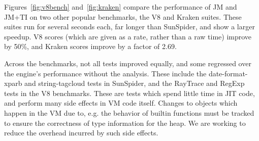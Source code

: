 Figures~\ref{fig:v8bench} and~\ref{fig:kraken} compare the performance of JM and JM+TI
on two other popular benchmarks, the V8 \cite{XXX} and Kraken \cite{XXX} suites.
These suites run for several seconds each, far longer than SunSpider,
and show a larger speedup.
V8 scores (which are given as a rate, rather than a raw time) improve by 50\%,
and Kraken scores improve by a factor of 2.69.

Across the benchmarks, not all tests improved equally, and some regressed over
the engine's performance without the analysis.
These include the date-format-xparb and string-tagcloud tests in SunSpider,
and the RayTrace and RegExp tests in the V8 benchmarks.
These are tests which spend little time in JIT code, and perform many side
effects in VM code itself.
Changes to objects which happen in the VM due to, e.g. the behavior of
builtin functions must be tracked to ensure the correctness of type
information for the heap.
We are working to reduce the overhead incurred by such side effects.

